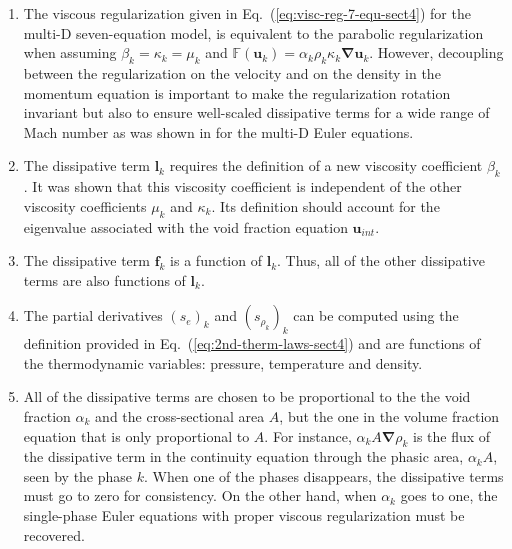 \documentclass[preprint,10pt]{elsarticle}
\newcommand{\grad}{\mbold{\nabla}}
\newcommand{\mbold}[1]{\boldsymbol#1}
\newcommand{\eqt}[1]{Eq.~(\ref{#1})}                     %
\newcommand{\tcr}[1]{\textcolor{red}{#1}}
\begin{document}
\begin{enumerate}
\item {The viscous regularization given in \eqt{eq:visc-reg-7-equ-sect4} for the multi-D seven-equation model, is equivalent to the parabolic regularization \cite{Parabolic} when assuming $\beta_k = \kappa_k = \mu_k$ and $\mathbb{F}(\mbold u_k) = \alpha_k \rho_k \kappa_k \grad \mbold u_k$. However, decoupling between the regularization on the velocity and on the density in the momentum equation is important to make the regularization rotation invariant but also to ensure well-scaled dissipative terms for a wide range of Mach number as was shown in \cite{Marco_paper_low_mach} for the multi-D Euler equations.}
\item {The dissipative term $\mbold l_k$ requires the definition of a new viscosity
    coefficient $\beta_k$. It was shown that this viscosity coefficient is independent of
    the other viscosity coefficients $\mu_k$ and $\kappa_k$. Its definition should
    account for the eigenvalue associated with the void fraction equation $\mbold u_{int}$.}

\item {The dissipative term $\mbold f_k$ is a function of $\mbold l_k$. Thus, all of the other
    dissipative terms are also functions of $\mbold l_k$.}

\item {The partial derivatives $(s_e)_k$ and $(s_{\rho_k})_k$ can be computed using the
    definition provided in \eqt{eq:2nd-therm-laws-sect4} and are functions of the thermodynamic
    variables: pressure, temperature and density.}

\item {All of the dissipative terms are chosen to be proportional to the the void
    fraction $\alpha_k$ and the cross-sectional area $A$, but the one in the volume fraction equation that is only proportional to $A$. For instance, $\alpha_k A \grad \rho_k$ is the
    flux of the dissipative term in the continuity equation through the phasic area, $\alpha_k A$, seen
    by the phase $k$. When one of the phases disappears, the dissipative terms
    must go to zero for consistency. On the other hand, when $\alpha_k$ goes to one,
    the single-phase Euler equations with proper viscous regularization must be recovered. }    
    

\end{enumerate}
\end{document}
